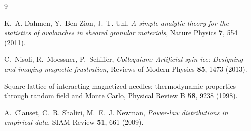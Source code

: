 \documentclass[11pt,a4paper]{article}
\begin{document}
\begin{thebibliography}{9}

K.~A. Dahmen, Y.~Ben-Zion, J.~T. Uhl,
\emph{A simple analytic theory for the statistics of avalanches in
sheared granular materials},
Nature Physics \textbf{7}, 554 (2011).

C.~Nisoli, R.~Moessner, P.~Schiffer,
\emph{Colloquium: Artificial spin ice: Designing and imaging magnetic
frustration},
Reviews of Modern Physics \textbf{85}, 1473 (2013).

Square lattice of interacting magnetized needles: thermodynamic
properties through random field and Monte Carlo,
Physical Review B \textbf{58}, 9238 (1998).

A.~Clauset, C.~R. Shalizi, M.~E.~J. Newman,
\emph{Power-law distributions in empirical data},
SIAM Review \textbf{51}, 661 (2009).

\end{thebibliography}
\end{document}
